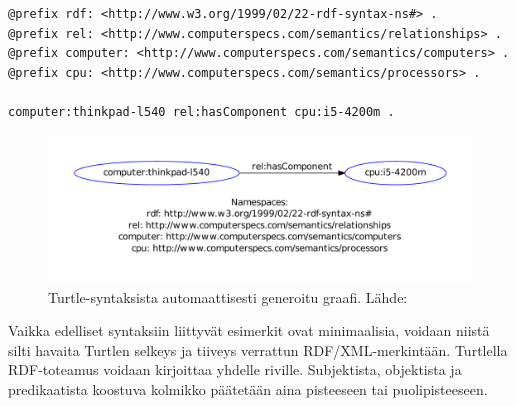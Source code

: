 \documentclass[finnish, 12pt, a4paper, elec, utf8, pdfa, online]{aaltothesis}
\begin{document}
\vskip 0.75cm
\begin{lstlisting}[style=codeblock,caption={Turtle syntaksiesimerkki.},captionpos=b,label={turtle_esim}]
@prefix rdf: <http://www.w3.org/1999/02/22-rdf-syntax-ns#> .
@prefix rel: <http://www.computerspecs.com/semantics/relationships> .
@prefix computer: <http://www.computerspecs.com/semantics/computers> .
@prefix cpu: <http://www.computerspecs.com/semantics/processors> .

computer:thinkpad-l540 rel:hasComponent cpu:i5-4200m .

\end{lstlisting}
\vskip 0.75cm

\begin{figure}[htb]
\centering
\includegraphics[width=15cm]{images/RDF-triplet2.pdf}
\vspace{-3pc}
\caption{Turtle-syntaksista automaattisesti generoitu graafi. Lähde: \cite{SeCo_RDF_validator} \label{images/RDF-triplet2}}
\end{figure}

Vaikka edelliset syntaksiin liittyvät esimerkit ovat minimaalisia, voidaan niistä silti havaita Turtlen selkeys ja tiiveys verrattun RDF/XML-merkintään. Turtlella RDF-toteamus voidaan kirjoittaa yhdelle riville. Subjektista, objektista ja predikaatista koostuva kolmikko päätetään aina pisteeseen tai puolipisteeseen.
\end{document}
